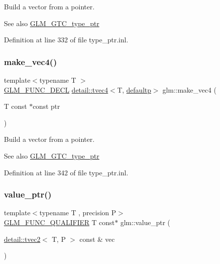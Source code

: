 Build a vector from a pointer. \begin{DoxySeeAlso}{See also}
\hyperlink{group__gtc__type__ptr}{G\+L\+M\+\_\+\+G\+T\+C\+\_\+type\+\_\+ptr} 
\end{DoxySeeAlso}


Definition at line 332 of file type\+\_\+ptr.\+inl.

\mbox{\label{group__gtc__type__ptr_ga1b9e0d9ca48d79ba87edc121c1872c44}} 
\subsubsection{\texorpdfstring{make\+\_\+vec4()}{make\_vec4()}}
{\footnotesize\ttfamily template$<$typename T $>$ \\
\hyperlink{setup_8hpp_ab2d052de21a70539923e9bcbf6e83a51}{G\+L\+M\+\_\+\+F\+U\+N\+C\+\_\+\+D\+E\+CL} \hyperlink{structglm_1_1detail_1_1tvec4}{detail\+::tvec4}$<$T, \hyperlink{namespaceglm_a0f04f086094c747d227af4425893f545a9d21ccd8b5a009ec7eb7677befc3bf51}{defaultp}$>$ glm\+::make\+\_\+vec4 (\begin{DoxyParamCaption}\item[{T const $\ast$const}]{ptr }\end{DoxyParamCaption})}

Build a vector from a pointer. \begin{DoxySeeAlso}{See also}
\hyperlink{group__gtc__type__ptr}{G\+L\+M\+\_\+\+G\+T\+C\+\_\+type\+\_\+ptr} 
\end{DoxySeeAlso}


Definition at line 342 of file type\+\_\+ptr.\+inl.

\mbox{\label{group__gtc__type__ptr_gac57a976f59e794e6406ecf2924a18f4e}} 
\subsubsection{\texorpdfstring{value\+\_\+ptr()}{value\_ptr()}\hspace{0.1cm}{\footnotesize\ttfamily [1/27]}}
{\footnotesize\ttfamily template$<$typename T , precision P$>$ \\
\hyperlink{setup_8hpp_a33fdea6f91c5f834105f7415e2a64407}{G\+L\+M\+\_\+\+F\+U\+N\+C\+\_\+\+Q\+U\+A\+L\+I\+F\+I\+ER} T const$\ast$ glm\+::value\+\_\+ptr (\begin{DoxyParamCaption}\item[{\hyperlink{structglm_1_1detail_1_1tvec2}{detail\+::tvec2}$<$ T, P $>$ const \&}]{vec }\end{DoxyParamCaption})}

